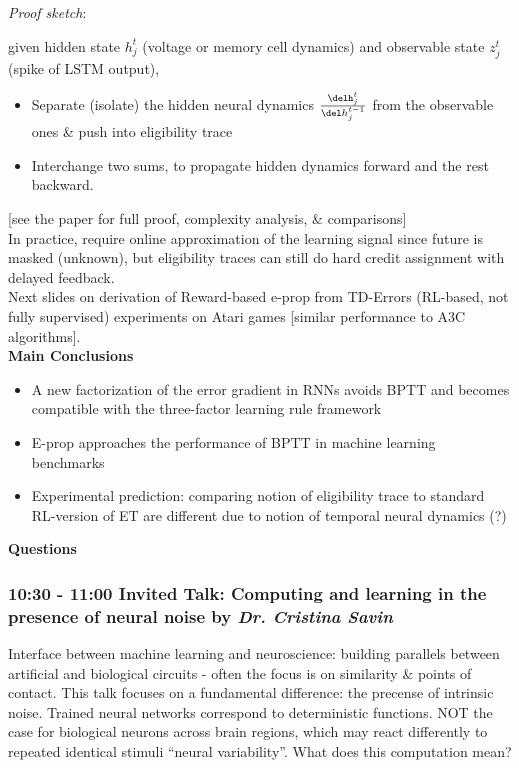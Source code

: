 \documentclass[12pt]{article}
\begin{document}
\textit{Proof sketch}:

given hidden state $h_j^t$ (voltage or memory cell dynamics) and observable state $z_j^t$ (spike of LSTM output), 
\begin{itemize}
    \item Separate (isolate) the hidden neural dynamics $\frac{\delh_j^t}{\del h_j^{t-1}}$ from the observable ones & push into eligibility trace
    \item Interchange two sums, to propagate hidden dynamics forward and the rest backward.
\end{itemize}

[see the paper for full proof, complexity analysis, & comparisons] \\

In practice, require online approximation of the learning signal since future is masked (unknown), but eligibility traces can still do hard credit assignment with delayed feedback. \\

Next slides on derivation of Reward-based e-prop from TD-Errors (RL-based, not fully supervised) experiments on Atari games [similar performance to A3C algorithms]. \\

\textbf{Main Conclusions} 
\begin{itemize}
    \item A new factorization of the error gradient in RNNs avoids BPTT and becomes compatible with the three-factor learning rule framework
    \item E-prop approaches the performance of BPTT in machine learning benchmarks
    \item Experimental prediction: comparing notion of eligibility trace to standard RL-version of ET are different due to notion of temporal neural dynamics (?)
\end{itemize}

\textbf{Questions} 


\subsubsection{10:30 - 11:00 Invited Talk: Computing and learning in the presence of neural noise by \textit{Dr. Cristina Savin}}

Interface between machine learning and neuroscience: building parallels between artificial and biological circuits - often the focus is on similarity \& points of contact. This talk focuses on a fundamental difference: the precense of intrinsic noise. Trained neural networks correspond to deterministic functions. NOT the case for biological neurons across brain regions, which may react differently to repeated identical stimuli ``neural variability''. What does this computation mean? \\
\end{document}
